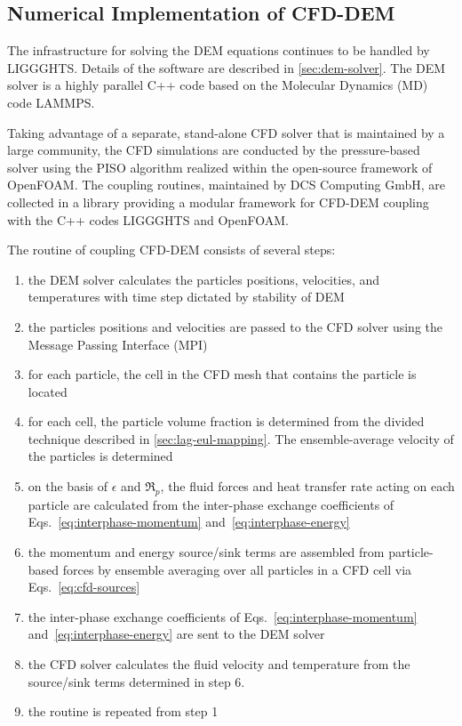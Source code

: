 \subsection{Numerical Implementation of CFD-DEM}\label{sec:cfd-dem-solver}

The infrastructure for solving the DEM equations continues to be handled by LIGGGHTS. Details of the software are described in \cref{sec:dem-solver}. The DEM solver is a highly parallel C++ code based on the Molecular Dynamics (MD) code LAMMPS.\cite{Plimpton1995}

Taking advantage of a separate, stand-alone CFD solver that is maintained by a large community, the CFD simulations are conducted by the pressure-based solver using the PISO algorithm realized within the open-source framework of OpenFOAM\textsuperscript{\textregistered}.\cite{Issa1986,OpenCFDLtd2014} The coupling routines, maintained by DCS Computing GmbH, are collected in a library providing a modular framework for CFD-DEM coupling with the C++ codes LIGGGHTS and OpenFOAM\textsuperscript{\textregistered}.\cite{Kloss2012,Goniva2012}


The routine of coupling CFD-DEM consists of several steps:
\begin{enumerate}
\item the DEM solver calculates the particles positions, velocities, and temperatures with time step dictated by stability of DEM
\item the particles positions and velocities are passed to the CFD solver using the Message Passing Interface (MPI)
\item for each particle, the cell in the CFD mesh that contains the particle is located
\item for each cell, the particle volume fraction is determined from the divided technique described in \cref{sec:lag-eul-mapping}. The ensemble-average velocity of the particles is determined
\item on the basis of $\epsilon$ and $\Re_p$, the fluid forces and heat transfer rate acting on each particle are calculated from the inter-phase exchange coefficients of Eqs.~\ref{eq:interphase-momentum} and~\ref{eq:interphase-energy}
\item the momentum and energy source/sink terms are assembled from particle-based forces by ensemble averaging over all particles in a CFD cell via Eqs.~\ref{eq:cfd-sources}
\item the inter-phase exchange coefficients of Eqs.~\ref{eq:interphase-momentum} and~\ref{eq:interphase-energy} are sent to the DEM solver
\item the CFD solver calculates the fluid velocity and temperature from the source/sink terms determined in step 6.
\item the routine is repeated from step 1
\end{enumerate}
